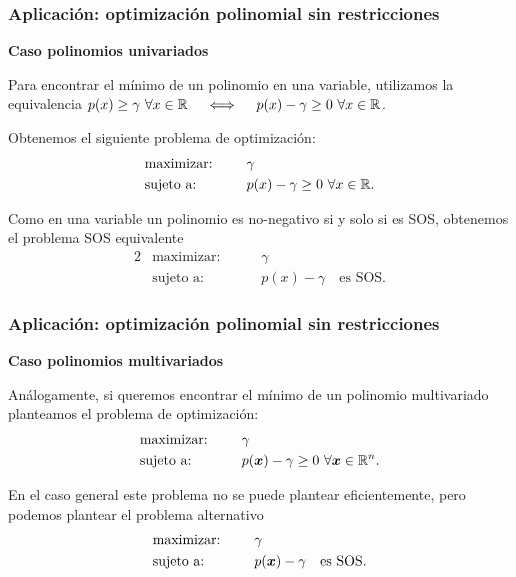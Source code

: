 \documentclass[aspectratio=169,12pt,spanish]{beamer}
\begin{document}
\begin{frame}

\frametitle{Aplicación: optimización polinomial sin restricciones}

\textbf{Caso polinomios univariados}

Para encontrar el mínimo de un polinomio en una variable, utilizamos la equivalencia $
p(x) \ge \gamma \ \forall x \in \mathbb{R} \quad \iff \quad p(x) - \gamma \ge 0 \ \forall x \in \mathbb{R}$.

Obtenemos el siguiente problema de optimización:
\begin{alignat*}{2}
  & \text{maximizar: } & & \gamma  \\
  & \text{sujeto a: } & \quad & p(x) - \gamma \ge 0 \ \forall x \in \R.
\end{alignat*}

Como en una variable un polinomio es no-negativo si y solo si es SOS, obtenemos el problema SOS equivalente
\begin{alignat*}{2}
  & \text{maximizar: } & & \gamma  \\
  & \text{sujeto a: } & \quad & p(x) - \gamma \quad \text{es SOS}.
\end{alignat*}

\end{frame}


\begin{frame}

\frametitle{Aplicación: optimización polinomial sin restricciones}

\textbf{Caso polinomios multivariados}

Análogamente, si queremos encontrar el mínimo de un polinomio multivariado planteamos el problema de optimización:
\begin{alignat*}{2}
  & \text{maximizar: } & & \gamma  \\
  & \text{sujeto a: } & \quad & p(\xb) - \gamma \ge 0 \ \forall \xb \in \R^n.
\end{alignat*}

En el caso general este problema no se puede plantear eficientemente, pero podemos plantear el problema alternativo
\begin{alignat*}{2}
  & \text{maximizar: } & & \gamma  \\
  & \text{sujeto a: } & \quad & p(\bm{x}) - \gamma \quad \text{es SOS}.
\end{alignat*}

\end{frame}
\end{document}
